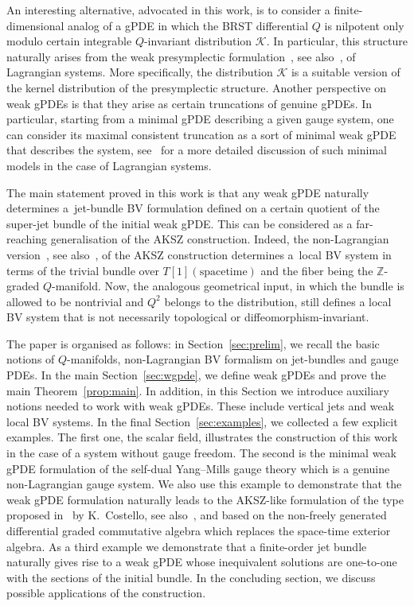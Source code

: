 \documentclass[pdftex]{sigma}
\numberwithin{equation}{section}
\theoremstyle{definition}
\newcommand{\changed}[1]{{#1}}
\newcommand{\fZ}{\mathbb{Z}}
\def\cK{\mathcal{K}}
\begin{document}
An interesting alternative, advocated in this work, is to consider a finite-dimensional analog of a gPDE in which the BRST differential $Q$ is nilpotent only modulo certain integrable $Q$-invariant distribution $\cK$. In particular, this structure naturally arises from the weak presymplectic formulation~\cite{Dneprov:2024cvt, Grigoriev:2022zlq}, see also~\cite{Alkalaev:2013hta,Dneprov:2022jyn,Grigoriev:2016wmk,Grigoriev:2020xec,Sharapov:2021drr}, of Lagrangian systems. More specifically, the distribution $\cK$ is a suitable version of the kernel distribution of the presymplectic structure. Another perspective on weak gPDEs is that they arise as certain truncations of genuine gPDEs. In particular, starting from a minimal gPDE describing a given gauge system, one can consider its maximal consistent truncation as a sort of minimal weak gPDE that describes the system, see~\cite{Dneprov:2024cvt} for a more detailed discussion of such minimal models in the case of Lagrangian systems.

The main statement proved in this work is that any weak gPDE naturally determines a~jet-bundle BV formulation defined on a certain quotient of the super-jet bundle of the initial weak gPDE. This can be considered as a far-reaching generalisation of the AKSZ construction. Indeed, the non-Lagrangian version~\cite{Barnich:2006hbb,Grigoriev:2006tt}, see also~\cite{Barnich:2009jy, Kotov:2007nr}, of the AKSZ construction determines a~local BV system in terms of the trivial bundle over $T[1](\text{spacetime})$ and the
fiber being the $\fZ$-graded $Q$-manifold. Now, the analogous geometrical input, in which the bundle is allowed to be nontrivial and $Q^2$ belongs to the distribution, still defines a local BV system that is not necessarily topological or diffeomorphism-invariant.

The paper is organised as follows: in Section~\ref{sec:prelim}, we recall the basic notions of $Q$-manifolds, non-Lagrangian BV formalism on jet-bundles and gauge PDEs. In the main Section~\ref{sec:wgpde}, we define weak gPDEs and prove the main Theorem~\ref{prop:main}. In addition, in this Section we introduce auxiliary notions needed to work with weak gPDEs. These include vertical jets and weak local BV systems.
In the final Section~\ref{sec:examples}, we collected a few explicit examples. The first one, the scalar field, illustrates the construction of this work in the case of a system without gauge freedom. The second is the minimal weak gPDE formulation of the self-dual Yang--Mills gauge theory which is a genuine non-Lagrangian gauge system. \changed{We also use this example to demonstrate that the weak gPDE formulation naturally leads to the AKSZ-like formulation of the type proposed in~\cite{costello2011renormalization} by K.~Costello, see also~\cite{Bonechi:2022aji,Bonechi:2009kx,Grigoriev:2025vsl}, and based on the non-freely generated differential graded commutative algebra which replaces the space-time exterior algebra.} As a third example we demonstrate that a finite-order jet bundle naturally gives rise to a weak gPDE whose inequivalent solutions are one-to-one with the sections of the initial bundle. In the concluding section, we discuss possible applications of the construction.
\end{document}

